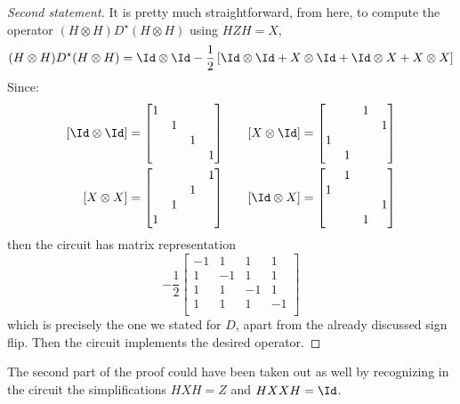 \begin{proof}[Second statement]
	It is pretty much straightforward, from here, to compute the operator $(H \otimes H) D^\star (H \otimes H)$ using $HZH=X$,
	\[
		(H \otimes H) D^\star (H \otimes H) = \Id \otimes \Id
		- \frac{1}{2} \lrS{\Id \otimes \Id + X \otimes \Id + \Id \otimes X + X \otimes X}
	\]
	Since:
	\[
	\begin{aligned}
		\lrS{\Id \otimes \Id} &= \begin{bmatrix}
			1 & & & \\
			& 1 & & \\
			& & 1 & \\
			& & & 1
		\end{bmatrix} \\ 
		\lrS{X \otimes X} &= \begin{bmatrix}
			& & & 1 \\
			& & 1 & \\
			& 1 & & \\
			1 & & &
		\end{bmatrix}
	\end{aligned}
	\qquad
	\begin{aligned}
		\lrS{X \otimes \Id} &= \begin{bmatrix}
			& & 1 & \\
			& & & 1 \\
			1 & & & \\
			& 1 & &
		\end{bmatrix} \\
		\lrS{\Id \otimes X} &= \begin{bmatrix}
			& 1 & & \\
			1 & & & \\
			& & & 1 \\
			& & 1 &
		\end{bmatrix}
	\end{aligned}
	\]
	then the circuit has matrix representation
	\[
	- \frac{1}{2} \begin{bmatrix}
		-1 &  1 &  1 & 1 \\
		1 & -1 &  1 & 1 \\
		1 &  1 & -1 & 1 \\
		1 &  1 &  1 & -1 \\
	\end{bmatrix}
	\]
	which is precisely the one we stated for $D$, apart from the already discussed sign flip. Then the circuit implements the desired operator.
\end{proof}

The second part of the proof could have been taken out as well by recognizing in the circuit the simplifications $HXH=Z$ and $HXXH=\Id$.

